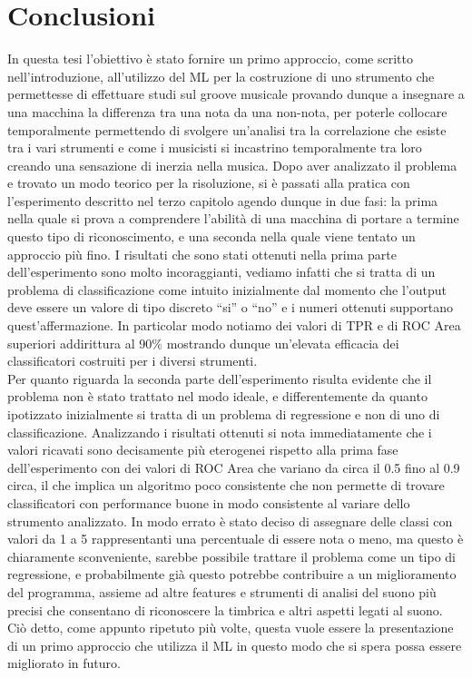\chapter*{Conclusioni}
In questa tesi l'obiettivo è stato fornire un primo approccio, come scritto nell'introduzione, all'utilizzo del ML per la costruzione di uno strumento che permettesse di effettuare studi sul groove musicale provando dunque a insegnare a una macchina la differenza tra una nota da una non-nota, per poterle collocare temporalmente permettendo di svolgere un'analisi tra la correlazione che esiste tra i vari strumenti e come i musicisti si incastrino temporalmente tra loro creando una sensazione di inerzia nella musica. Dopo aver analizzato il problema e trovato un modo teorico per la risoluzione, si è passati alla pratica con l'esperimento descritto nel terzo capitolo agendo dunque in due fasi: la prima nella quale si prova a comprendere l'abilità di una macchina di portare a termine questo tipo di riconoscimento, e una seconda nella quale viene tentato un approccio più fino. I risultati che sono stati ottenuti nella prima parte dell'esperimento sono molto incoraggianti, vediamo infatti che si tratta di un problema di classificazione come intuito inizialmente dal momento che l'output deve essere un valore di tipo discreto ``si'' o ``no'' e i numeri ottenuti supportano quest'affermazione. In particolar modo notiamo dei valori di TPR e di ROC Area superiori addirittura al 90\% mostrando dunque un'elevata efficacia dei classificatori costruiti per i diversi strumenti.\\
Per quanto riguarda la seconda parte dell'esperimento risulta evidente che il problema non è stato trattato nel modo ideale, e differentemente da quanto ipotizzato inizialmente si tratta di un problema di regressione e non di uno di classificazione. Analizzando i risultati ottenuti si nota immediatamente che i valori ricavati sono decisamente più eterogenei rispetto alla prima fase dell'esperimento con dei valori di ROC Area che variano da circa il 0.5 fino al 0.9 circa, il che implica un algoritmo poco consistente che non permette di trovare classificatori con performance buone in modo consistente al variare dello strumento analizzato. In modo errato è stato deciso di assegnare delle classi con valori da 1 a 5 rappresentanti una percentuale di essere nota o meno, ma questo è chiaramente sconveniente, sarebbe possibile trattare il problema come un tipo di regressione, e probabilmente già questo potrebbe contribuire a un miglioramento del programma, assieme ad altre features e strumenti di analisi del suono più precisi che consentano di riconoscere la timbrica e altri aspetti legati al suono.\\
Ciò detto, come appunto ripetuto più volte, questa vuole essere la presentazione di un primo approccio che utilizza il ML in questo modo che si spera possa essere migliorato in futuro.

